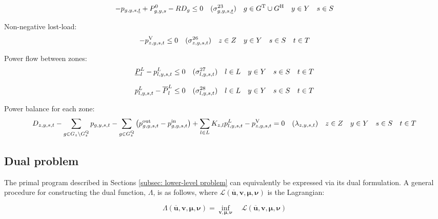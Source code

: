 \documentclass{article}
\newcommand{\sScenarioSets}{\quad  \iYear \in \sYears \quad  \iScenario \in \sScenarios \quad  \iInterval \in \sIntervals}
\begin{document}
\begin{equation}
- \vPower[\iGenerator,\iYear,\iScenario,\iIntervalStart] + \cPowerInitial - \cRampRateDown \leq 0 \quad (\dRampRateDown[\iGenerator,\iYear,\iScenario,\iIntervalStart]) \quad  \iGenerator \in \sGeneratorsThermal \cup \sGeneratorsHydro \quad  \iYear \in \sYears \quad  \iScenario \in \sScenarios
\end{equation}

Non-negative lost-load:
\begin{equation}
	- \vLostLoadPower \leq 0 \quad (\dNonNegativeLostLoad) \quad  \iZone \in \sZones \sScenarioSets
\end{equation}

Power flow between zones:
\begin{equation}
	\cPowerFlowMin - \vPowerFlow \leq 0 \quad (\dMinPowerFlow) \quad  \iLink \in \sLinks \sScenarioSets
\end{equation}

\begin{equation}
	\vPowerFlow - \cPowerFlowMax \leq 0 \quad (\dMaxPowerFlow) \quad  \iLink \in \sLinks \sScenarioSets
\end{equation}

Power balance for each zone:
\begin{equation}
\cDemand - \sum\limits_{\iGenerator \in \sGenerators_{\iZone} \setminus \sStorage_{\iZone}} \vPower - \sum\limits_{\iGenerator \in \sStorage_{\iZone}} \left(\vPowerOut - \vPowerIn\right) + \sum\limits_{\iLink \in \sLinks} \cIncidenceMatrix \vPowerFlow - \vLostLoadPower = 0 \quad (\dPowerBalance) \quad  \iZone \in \sZones \sScenarioSets
\label{eqn: power balance}
\end{equation}

\subsection{Dual problem}
The primal program described in Sections \ref{subsec: lower-level problem} can equivalently be expressed via its dual formulation. A general procedure for constructing the dual function, $\Lambda$, is as follows, where $\mathcal{L}(\bm{\overline{u}}, \bm{v}, \bm{\mu}, \bm{\nu})$ is the Lagrangian:

\begin{equation}
\Lambda(\bm{\overline{u}}, \bm{v}, \bm{\mu}, \bm{\nu}) = \inf\limits_{\bm{v}, \bm{\mu}, \bm{\nu}} \quad \mathcal{L}(\bm{\overline{u}}, \bm{v}, \bm{\mu}, \bm{\nu})
\end{equation}
\end{document}
